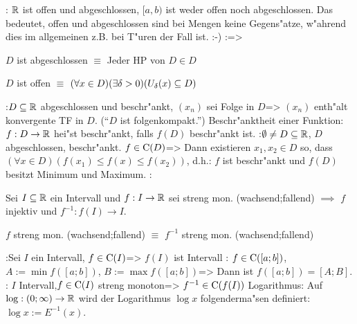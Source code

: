 \remark:{
  $\mathbb R$ ist offen und abgeschlossen,
  $[a,b)$ ist weder offen noch abgeschlossen. 
  Das bedeutet, offen und abgeschlossen sind bei Mengen keine Gegens"atze,
  w"ahrend dies im allgemeinen z.B. bei T"uren der Fall ist. :-)
  }
\lessertheorem:=>{
  $D$ ist abgeschlossen $\equiv$ Jeder HP von $D\in D$
  
  $D$ ist offen $\equiv$
  $(\forall x\in D)(\exists \delta>0)(U_\delta(x)\subseteq D)$
}
\lessertheorem:$D\subseteq\mathbb R$ abgeschlossen und beschr"ankt,
  $(x_n)$ sei Folge in $D$=>{
  $(x_n)$ enth"alt konvergente TF in $D$. (``$D$ ist folgenkompakt.'')
  }
 Beschr"anktheit einer Funktion:{
  $f:D\to\mathbb R$ hei"st beschr"ankt, falls $f(D)$ beschr"ankt ist.
  }
\theorem:$\emptyset\ne D\subseteq\mathbb R$, $D$ abgeschlossen, beschr"ankt.
  $f\in{\rm C}(D)$=>{
  Dann existieren $x_1,x_2\in D$ so, dass 
  $(\forall x\in D)(f(x_1)\le f(x)\le f(x_2))$,
  d.h.: $f$ ist beschr"ankt und $f(D)$ besitzt Minimum und Maximum.
  }
\remark:{
  Sei $ I\subseteq\mathbb R$ ein Intervall und $f: I\to\mathbb R$ sei
  streng mon. \tstack(wachsend;fallend) $\implies$ $f$ injektiv und
  $f^{-1}:f( I)\to I$.

  $f$ streng mon. \tstack(wachsend;fallend) $\equiv$
  $f^{-1}$ streng mon. \tstack(wachsend;fallend)
}
\theorem:Sei $ I$ ein Intervall, $f\in{\rm C}( I)$=>{
  $f( I)$ ist Intervall
  }
\lessertheorem:
  $f\in{\rm C}([a;b])$, $A:=\min f([a;b])$, $B:=\max f([a;b])$=>{
  Dann ist $f([a;b])=[A;B]$.
  }
\theorem: $ I$ Intervall,$f\in{\rm C}( I)$ streng monoton=>{
  $f^{-1}\in{\rm C}(f(I))$
  }
 Logarithmus:{
  Auf $\log:(0;\infty)\to\mathbb R$ wird der Logarithmus $\log x$ folgenderma"sen
  definiert: $\log x:=E^{-1}(x)$.
  }
